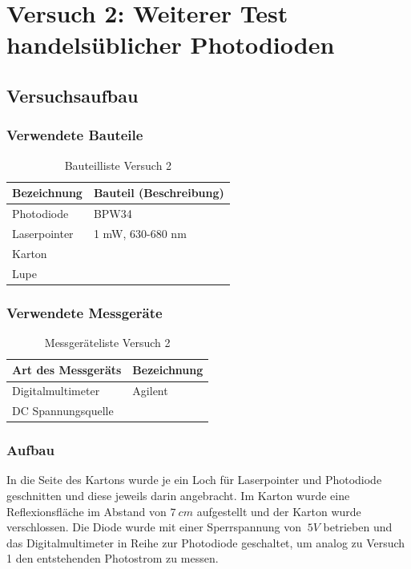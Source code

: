 \section{Versuch 2: Weiterer Test handelsüblicher Photodioden}
\subsection{Versuchsaufbau}
\subsubsection{Verwendete Bauteile}
\begin{table}[H]
	\centering
	\caption{Bauteilliste Versuch 2}
	\begin{tabular}{|l|l|}
		\hline
		\textbf{Bezeichnung} & \textbf{Bauteil (Beschreibung)}
		\\\hline
		Photodiode & BPW34
		\\\hline
		Laserpointer & 1 mW, 630-680 nm
		\\\hline
		Karton & 
		\\\hline
		Lupe &
		\\\hline
	\end{tabular}
\end{table}

\subsubsection{Verwendete Messgeräte}
\begin{table}[H]
	\centering
	\caption{Messgeräteliste Versuch 2}
	\begin{tabular}{|l|l|}
		\hline
		\textbf{Art des Messgeräts} & \textbf{Bezeichnung}
		\\\hline
		Digitalmultimeter & Agilent
		\\\hline
		DC Spannungsquelle & 
		\\\hline
	\end{tabular}
\end{table}
\subsubsection{Aufbau}
In die Seite des Kartons wurde je ein Loch für Laserpointer und Photodiode geschnitten und diese jeweils darin angebracht. Im Karton wurde eine Reflexionsfläche im Abstand von $7\:cm$ aufgestellt und der Karton wurde verschlossen. Die Diode wurde mit einer Sperrspannung von $\:5V$ betrieben und das Digitalmultimeter in Reihe zur Photodiode geschaltet, um analog zu Versuch 1 den entstehenden Photostrom zu messen. 
